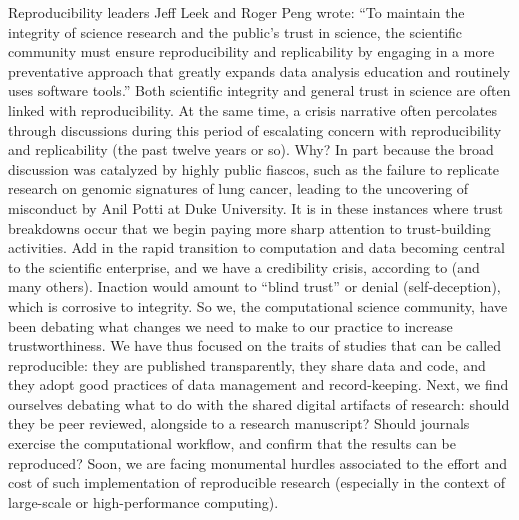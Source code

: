 \documentclass{statement}
\begin{document}
Reproducibility leaders Jeff Leek and Roger Peng wrote: ``To maintain the integrity of science research and the public’s trust in science, the scientific community must ensure reproducibility and replicability by engaging in a more preventative approach that greatly expands data analysis education and routinely uses software tools.'' \citep{leek-peng2015} 
Both scientific integrity and general trust in science are often linked with reproducibility. 
At the same time, a crisis narrative often percolates through discussions during this period of escalating concern with reproducibility and replicability (the past twelve years or so). 
Why? In part because the broad discussion was catalyzed by highly public fiascos, such as the failure to replicate research on genomic signatures of lung cancer, leading to the uncovering of misconduct by Anil Potti at Duke University.
It is in these instances where trust breakdowns occur that we begin paying more sharp attention to trust-building activities. 
Add in the rapid transition to computation and data becoming central to the scientific enterprise, and we have a credibility crisis, according to \cite{donoho2009} (and many others). 
Inaction would amount to ``blind trust'' or denial (self-deception), which is corrosive to integrity. 
So we, the computational science community, have been debating what changes we need to make to our practice to increase trustworthiness. 
We have thus focused on the traits of studies that can be called reproducible: they are published transparently, they share data and code, and they adopt good practices of data management and record-keeping. 
Next, we find ourselves debating what to do with the shared digital artifacts of research: should they be peer reviewed, alongside to a research manuscript? 
Should journals exercise the computational workflow, and confirm that the results can be reproduced? 
Soon, we are facing monumental hurdles associated to the effort and cost of such implementation of reproducible research (especially in the context of large-scale or high-performance computing).
\end{document}
